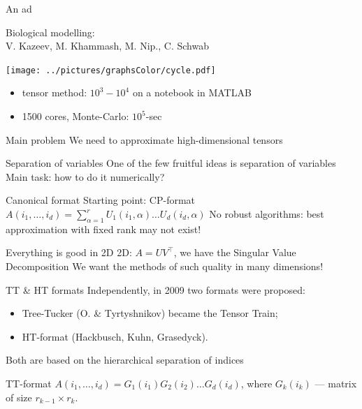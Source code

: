 \documentclass{beamer}[14pt, presentation]
\begin{document}
\begin{frame}[label=sec-2-2]{An ad}
 \begin{small}
Biological modelling:  \\ 
V. Kazeev, M. Khammash, M. Nip., C. Schwab 
 \vskip 2mm
 \end{small}
\texttt{[image: ../pictures/graphsColor/cycle.pdf]}

\begin{itemize}
\item tensor method: $10^3 - 10^4$ on a notebook in  MATLAB
\item 1500 cores, Monte-Carlo: $10^5$-sec
\end{itemize}
\end{frame}
\begin{frame}[label=sec-2-3]{Main problem}
\alert{We need to approximate high-dimensional tensors}
\end{frame}

\begin{frame}[label=sec-2-4]{Separation of variables}
One of the few fruitful ideas is \alert{separation of variables} \vskip 2mm
Main task: \alert{how to do it numerically?}
\end{frame}

\begin{frame}[label=sec-2-5]{Canonical format}
Starting point: \alert{CP-format} \vskip 2mm
$A(i_1,\ldots,i_d) = \sum_{\alpha=1}^r U_1(i_1,\alpha) \ldots U_d(i_d,
\alpha)$
\vskip 2mm
\alert{No robust algorithms}: best approximation with fixed rank may
not exist!
\end{frame}

\begin{frame}[label=sec-2-6]{Everything is good in 2D}
2D: $A = UV^{\top}$, we have the Singular Value Decomposition \vskip
2mm
We want the methods of such quality in many dimensions!
\end{frame}

\begin{frame}[label=sec-2-7]{TT \& HT formats}
Independently, in 2009 two formats were proposed: 
\begin{itemize}
\item Tree-Tucker (O. \& Tyrtyshnikov) became the Tensor Train;
\item HT-format (Hackbusch, Kuhn, Grasedyck).
\end{itemize}
Both are based on the hierarchical separation of indices
\vskip 2mm
\end{frame}

\begin{frame}[label=sec-2-8]{TT-format}
$A(i_1,\ldots,i_d) = G_1(i_1) G_2(i_2) \ldots G_d(i_d)$, \vskip 2mm
where $G_k(i_k)$ --- matrix of size $r_{k-1} \times r_k$.
\end{frame}
\end{document}

